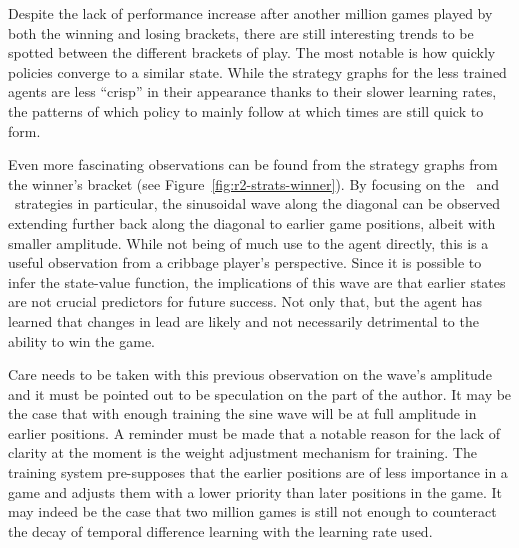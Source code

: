 


Despite the lack of performance increase after another million games played by
both the winning and losing brackets,
there are still interesting trends to be spotted between the different brackets
of play.
%
The most notable is how quickly policies converge to a similar state.
%
While the strategy graphs for the less trained agents are less ``crisp''
in their appearance thanks to their slower learning rates,
the patterns of which policy to mainly follow at which times
are still quick to form.

Even more fascinating observations can be found from the strategy graphs
from the winner's bracket (see Figure~\ref{fig:r2-strats-winner}).
%
By focusing on the \handmaxmin\ and \handmaxavg\ strategies in particular,
the sinusoidal wave along the diagonal can be observed extending further
back along the diagonal to earlier game positions,
albeit with smaller amplitude.
%
While not being of much use to the agent directly,
this is a useful observation from a cribbage player's perspective.
%
Since it is possible to infer the state-value function,
the implications of this wave are that earlier states are not crucial
predictors for future success.
%
Not only that,
but the agent has learned that changes in lead are likely and not necessarily
detrimental to the ability to win the game.

Care needs to be taken with this previous observation on the wave's amplitude
and it must be pointed out to be speculation on the part of the author.
%
It may be the case that with enough training the sine wave will be at full
amplitude in earlier positions.
%
A reminder must be made that
a notable reason for the lack of clarity at the moment is the weight adjustment
mechanism for training.
%
The training system pre-supposes that the earlier positions are of less
importance in a game and adjusts them with a lower priority than later positions
in the game.
%
It may indeed be the case that two million games is still not enough to
counteract the decay of temporal difference learning with the learning
rate used.





